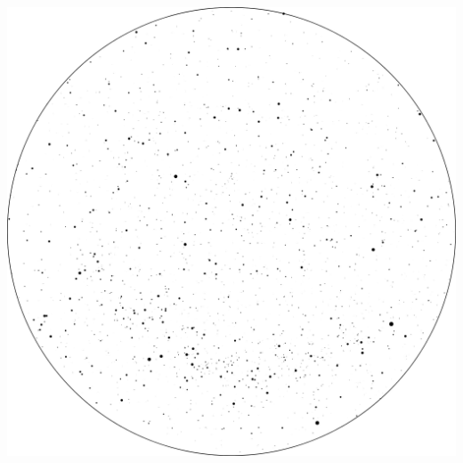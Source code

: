 \documentclass{./SAS-class-skygen}
\begin{document}
	\vspace{0.5cm}
    \begin{center}
    \includegraphics[width=\textwidth]{./pics/skychart5.png}
    \end{center}
    
    
\end{document}
